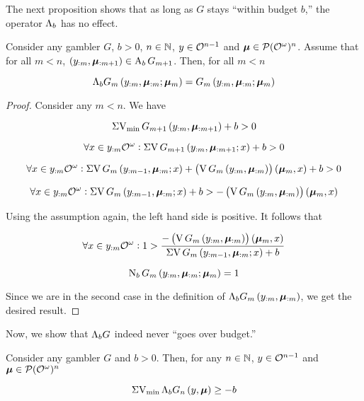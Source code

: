The next proposition shows that as long as $G$ stays \enquote{within budget $b$,} the operator $\Lambda_b$ has no effect. 

\begin{proposition}
\label{prp:b_no_effect}

Consider any gambler $G$, $b > 0$, $n \in \mathbb{N}$, $y \in \mathcal{O}^{n - 1}$ and $\bm{\mu} \in \mathcal{P}(\mathcal{O}^\omega)^n$. Assume that for all $m < n$, $\left(y_{:m},\bm{\mu}_{:m+1}\right) \in \operatorname{A}_b G_{m+1}$. Then, for all $m < n$

\begin{equation}
\Lambda_b G_m\left(y_{:m},\bm{\mu}_{:m};\bm{\mu}_m\right)=G_m\left(y_{:m},\bm{\mu}_{:m};\bm{\mu}_m\right)
\end{equation}

\end{proposition}

\begin{proof}

Consider any $m < n$. We have

$$\operatorname{\Sigma V_{\min}} G_{m+1}\left(y_{:m},\bm{\mu}_{:m+1}\right) + b > 0$$

$$\forall x \in y_{:m}\mathcal{O}^\omega: \operatorname{\Sigma V} G_{m+1}\left(y_{:m},\bm{\mu}_{:m+1}; x\right) + b > 0$$

$$\forall x \in y_{:m}\mathcal{O}^\omega: \operatorname{\Sigma V} G_{m}\left(y_{:m-1},\bm{\mu}_{:m}; x\right) + \left(\operatorname{V} G_{m}\left(y_{:m},\bm{\mu}_{:m}\right)\right)\left(\bm{\mu}_{m}, x\right) + b > 0$$

$$\forall x \in y_{:m}\mathcal{O}^\omega: \operatorname{\Sigma V} G_{m}\left(y_{:m-1},\bm{\mu}_{:m}; x\right) + b > -\left(\operatorname{V} G_{m}\left(y_{:m},\bm{\mu}_{:m}\right)\right)\left(\bm{\mu}_{m}, x\right)$$

Using the assumption again, the left hand side is positive. It follows that

$$\forall x \in y_{:m}\mathcal{O}^\omega: 1 > \frac{-\left(\operatorname{V} G_{m}\left(y_{:m},\bm{\mu}_{:m}\right)\right)\left(\bm{\mu}_{m}, x\right)}{\operatorname{\Sigma V} G_{m}\left(y_{:m-1},\bm{\mu}_{:m}; x\right) + b}$$

$$\operatorname{N}_b G_m\left(y_{:m},\bm{\mu}_{:m};\bm{\mu}_m\right) = 1$$

Since we are in the second case in the definition of ${\Lambda_b G_m\left(y_{:m},\bm{\mu}_{:m}\right)}$, we get the desired result.
\end{proof}

Now, we show that $\Lambda_b G$ indeed never \enquote{goes over budget.}

\begin{proposition}
\label{prp:b_stays_in_budget}

Consider any gambler $G$ and $b > 0$. Then, for any $n \in \mathbb{N}$, $y \in \mathcal{O}^{n-1}$ and $\bm{\mu} \in \mathcal{P}(\mathcal{O}^\omega)^n$

\begin{equation}
\operatorname{\Sigma V_{\min}} \Lambda_b G_n\left(y,\bm{\mu}\right) \geq -b
\end{equation} 

\end{proposition}

